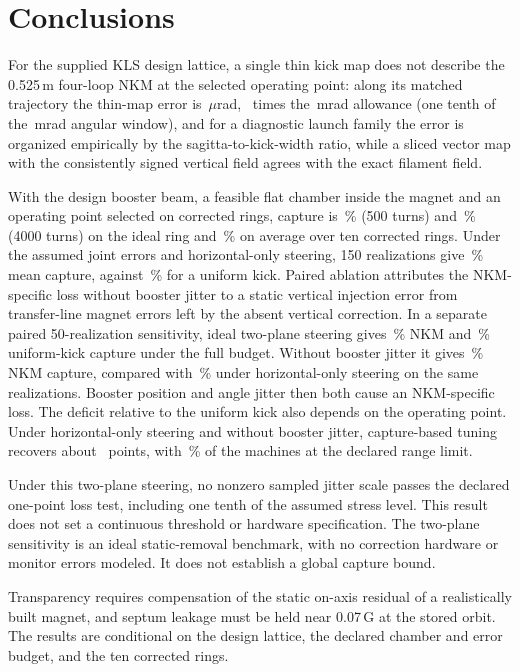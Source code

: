 \documentclass[aps,prab,reprint,amsmath,amssymb,floatfix,longbibliography]{revtex4-2}
\begin{document}
\section{Conclusions}
\label{sec:conclusions}

For the supplied KLS design lattice, a single thin kick map does not describe the 0.525\,m four-loop NKM at the selected operating point: along its matched trajectory the thin-map error is \ThinProdCurrentUrad\,$\mu$rad, \ThinProdRatio\ times the \ResidualAllowMrad\,mrad allowance (one tenth of the \FinalAngleWidth\,mrad angular window), and for a diagnostic launch family the error is organized empirically by the sagitta-to-kick-width ratio, while a sliced vector map with the consistently signed vertical field agrees with the exact filament field.

With the design booster beam, a feasible flat chamber inside the magnet and an operating point selected on corrected rings, capture is \ChamberNom\,\% (500 turns) and \FinalLong\,\% (4000 turns) on the ideal ring and \SynRingNkm\,\% on average over ten corrected rings. Under the assumed joint errors and horizontal-only steering, 150 realizations give \FinalNkmMean\,\% mean capture, against \FinalDipMean\,\% for a uniform kick. Paired ablation attributes the NKM-specific loss without booster jitter to a static vertical injection error from transfer-line magnet errors left by the absent vertical correction. In a separate paired 50-realization sensitivity, ideal two-plane steering gives \VsFullNkm\,\% NKM and \VsFullDip\,\% uniform-kick capture under the full budget. Without booster jitter it gives \VsZeroNkm\,\% NKM capture, compared with \AblFullNkm\,\% under horizontal-only steering on the same realizations. Booster position and angle jitter then both cause an NKM-specific loss. The deficit relative to the uniform kick also depends on the operating point. Under horizontal-only steering and without booster jitter, capture-based tuning recovers about \FinalTuneZeroGain\ points, with \FinalTuneBoundaryXinj\,\% of the machines at the declared range limit.

Under this two-plane steering, no nonzero sampled jitter scale passes the declared one-point loss test, including one tenth of the assumed stress level. This result does not set a continuous threshold or hardware specification. The two-plane sensitivity is an ideal static-removal benchmark, with no correction hardware or monitor errors modeled. It does not establish a global capture bound.

Transparency requires compensation of the static on-axis residual of a realistically built magnet, and septum leakage must be held near 0.07\,G at the stored orbit. The results are conditional on the design lattice, the declared chamber and error budget, and the ten corrected rings.
\end{document}
